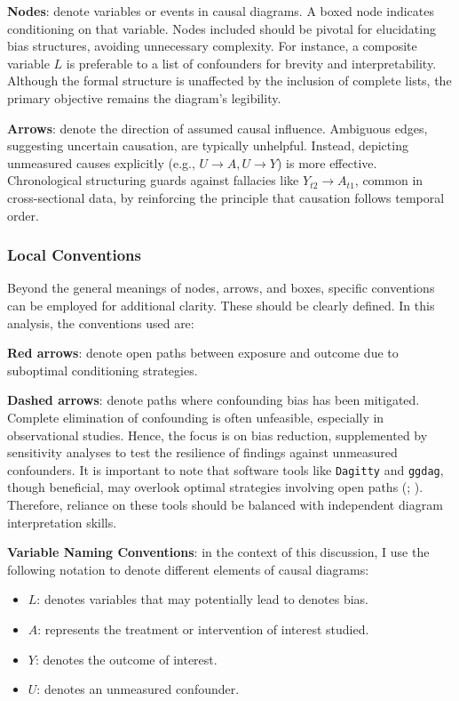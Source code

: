 \documentclass[
  singlecolumn,
  9pt]{article}
\providecommand{\tightlist}{%
  \setlength{\itemsep}{0pt}\setlength{\parskip}{0pt}}\usepackage{longtable,booktabs,array}
\begin{document}
\textbf{Nodes}: denote variables or events in causal diagrams. A boxed
node indicates conditioning on that variable. Nodes included should be
pivotal for elucidating bias structures, avoiding unnecessary
complexity. For instance, a composite variable \(L\) is preferable to a
list of confounders for brevity and interpretability. Although the
formal structure is unaffected by the inclusion of complete lists, the
primary objective remains the diagram's legibility.

\textbf{Arrows}: denote the direction of assumed causal influence.
Ambiguous edges, suggesting uncertain causation, are typically
unhelpful. Instead, depicting unmeasured causes explicitly (e.g.,
\(U \to A, U \to Y\)) is more effective. Chronological structuring
guards against fallacies like \(Y_{t2} \to A_{t1}\), common in
cross-sectional data, by reinforcing the principle that causation
follows temporal order.

\subsubsection{Local Conventions}\label{local-conventions}

Beyond the general meanings of nodes, arrows, and boxes, specific
conventions can be employed for additional clarity. These should be
clearly defined. In this analysis, the conventions used are:

\textbf{Red arrows}: denote open paths between exposure and outcome due
to suboptimal conditioning strategies.

\textbf{Dashed arrows}: denote paths where confounding bias has been
mitigated. Complete elimination of confounding is often unfeasible,
especially in observational studies. Hence, the focus is on bias
reduction, supplemented by sensitivity analyses to test the resilience
of findings against unmeasured confounders. It is important to note that
software tools like \texttt{Dagitty} and \texttt{ggdag}, though
beneficial, may overlook optimal strategies involving open paths
(;
). Therefore,
reliance on these tools should be balanced with independent diagram
interpretation skills.

\textbf{Variable Naming Conventions}: in the context of this discussion,
I use the following notation to denote different elements of causal
diagrams:

\begin{itemize}
\tightlist
\item
  \(L\): denotes variables that may potentially lead to denotes bias.
\item
  \(A\): represents the treatment or intervention of interest studied.
\item
  \(Y\): denotes the outcome of interest.
\item
  \(U\): denotes an unmeasured confounder.
\end{itemize}
\end{document}

